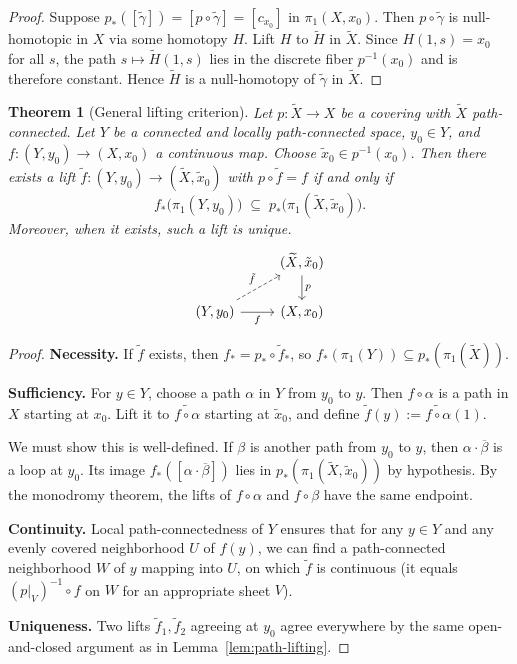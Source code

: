 \documentclass[12pt,a4paper,openany]{book}
\theoremstyle{definition}
\theoremstyle{plain}
\newtheorem{theorem}[definition]{Theorem}
\theoremstyle{remark}
\begin{document}
\begin{proof}
  Suppose $p_*([\tilde{\gamma}]) = [p \circ \tilde{\gamma}] = [c_{x_0}]$ in
  $\pi_1(X, x_0)$.  Then $p \circ \tilde{\gamma}$ is null-homotopic in $X$
  via some homotopy $H$.  Lift $H$ to $\widetilde{H}$ in $\widetilde{X}$.
  Since $H(1, s) = x_0$ for all $s$, the path $s \mapsto \widetilde{H}(1,s)$
  lies in the discrete fiber $p^{-1}(x_0)$ and is therefore constant.
  Hence $\widetilde{H}$ is a null-homotopy of $\tilde{\gamma}$ in
  $\widetilde{X}$.
\end{proof}

\begin{theorem}[General lifting criterion]\label{thm:lifting-criterion}
  Let $p\colon \widetilde{X} \to X$ be a covering with $\widetilde{X}$
  path-connected.  Let $Y$ be a connected and locally path-connected space,
  $y_0 \in Y$, and $f\colon (Y, y_0) \to (X, x_0)$ a continuous map.
  Choose $\tilde{x}_0 \in p^{-1}(x_0)$.  Then there exists a lift
  $\tilde{f}\colon (Y, y_0) \to (\widetilde{X}, \tilde{x}_0)$ with
  $p \circ \tilde{f} = f$ if and only if
  \[
    f_*\!\big(\pi_1(Y, y_0)\big) \;\subseteq\; p_*\!\big(\pi_1(\widetilde{X}, \tilde{x}_0)\big).
  \]
  Moreover, when it exists, such a lift is unique.
  \[
    \begin{tikzcd}
      & (\widetilde{X}, \tilde{x}_0) \ar[d,"p"] \\
      (Y, y_0) \ar[r,"f"'] \ar[ur,dashed,"\tilde{f}"] & (X, x_0)
    \end{tikzcd}
  \]
\end{theorem}

\begin{proof}
  \textbf{Necessity.}  If $\tilde{f}$ exists, then $f_* = p_* \circ
  \tilde{f}_*$, so $f_*(\pi_1(Y)) \subseteq p_*(\pi_1(\widetilde{X}))$.

  \textbf{Sufficiency.}  For $y \in Y$, choose a path $\alpha$ in $Y$ from
  $y_0$ to $y$.  Then $f \circ \alpha$ is a path in $X$ starting at $x_0$.
  Lift it to $\widetilde{f \circ \alpha}$ starting at $\tilde{x}_0$, and
  define $\tilde{f}(y) := \widetilde{f \circ \alpha}(1)$.

  We must show this is well-defined.  If $\beta$ is another path from $y_0$
  to $y$, then $\alpha \cdot \overline{\beta}$ is a loop at $y_0$.  Its image
  $f_*([\alpha \cdot \overline{\beta}])$ lies in
  $p_*(\pi_1(\widetilde{X}, \tilde{x}_0))$ by hypothesis.  By the monodromy
  theorem, the lifts of $f \circ \alpha$ and $f \circ \beta$ have the same
  endpoint.

  \textbf{Continuity.}  Local path-connectedness of $Y$ ensures that for any
  $y \in Y$ and any evenly covered neighborhood $U$ of $f(y)$, we can find a
  path-connected neighborhood $W$ of $y$ mapping into $U$, on which
  $\tilde{f}$ is continuous (it equals $(p|_V)^{-1} \circ f$ on $W$ for an
  appropriate sheet $V$).

  \textbf{Uniqueness.}  Two lifts $\tilde{f}_1, \tilde{f}_2$ agreeing at $y_0$
  agree everywhere by the same open-and-closed argument as in
  Lemma~\ref{lem:path-lifting}.
\end{proof}
\end{document}

